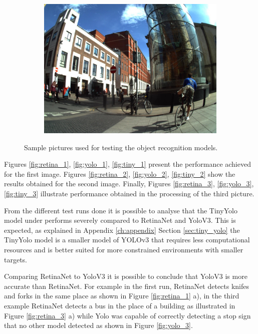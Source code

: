 \begin{figure}[H]
\begin{subfigure}{0.3\textwidth}
  \includegraphics[width=\textwidth]{Sections/4InitialWork/4_images_obj_run4/photo.jpg}
  \end{subfigure}

  \caption[Sample pictures used for testing]{Sample pictures used for testing the object recognition models.}
  \end{figure}


  Figures  \ref{fig:retina_1}, \ref{fig:yolo_1}, \ref{fig:tiny_1} present the performance achieved for the first image. Figures  \ref{fig:retina_2}, \ref{fig:yolo_2}, \ref{fig:tiny_2} show the results obtained for the second image. Finally, Figures \ref{fig:retina_3}, \ref{fig:yolo_3}, \ref{fig:tiny_3} illustrate performance obtained in the processing of the third picture.


  From the different test runs done it is possible to analyse that the TinyYolo model under performs severely compared to RetinaNet and YoloV3. This is expected, as explained in Appendix \ref{ch:appendix} Section \ref{sec:tiny_yolo} the TinyYolo model is a smaller model of YOLOv3 that requires less computational resources and is better suited for more constrained environments with smaller targets.

  Comparing RetinaNet to YoloV3 it is possible to conclude that YoloV3 is more accurate than RetinaNet. For example in the first run, RetinaNet detects knifes and forks in the same place as shown in Figure \ref{fig:retina_1} a), in the third example RetinaNet detects a bus in the place of a building as illustrated in Figure \ref{fig:retina_3} a) while Yolo was capable of correctly detecting a stop sign that no other model detected as shown in Figure \ref{fig:yolo_3}.

